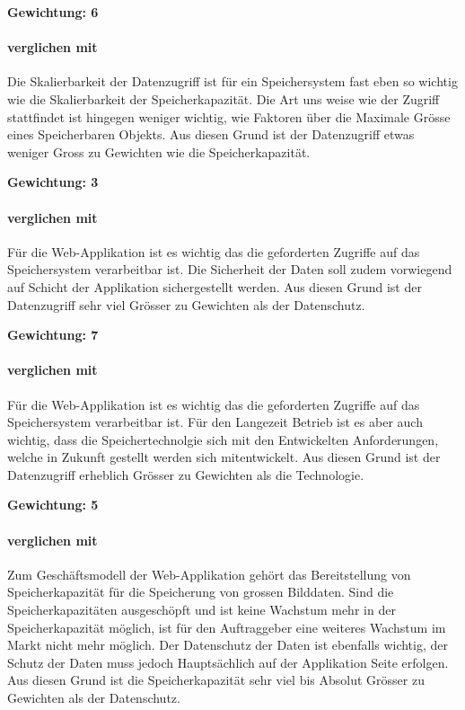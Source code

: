 \textbf{Gewichtung: 6}

\paragraph*{ verglichen mit }
Die Skalierbarkeit der Datenzugriff ist für ein Speichersystem fast eben so wichtig wie die Skalierbarkeit der Speicherkapazität. Die Art uns weise wie der Zugriff stattfindet ist hingegen weniger wichtig, wie Faktoren über die Maximale Grösse eines Speicherbaren Objekts. Aus diesen Grund ist der Datenzugriff etwas weniger Gross zu Gewichten wie die Speicherkapazität. 

\textbf{Gewichtung: 3}

\paragraph*{ verglichen mit }
Für die Web-Applikation ist es wichtig das die geforderten Zugriffe auf das Speichersystem verarbeitbar ist. Die Sicherheit der Daten soll zudem vorwiegend auf Schicht der Applikation sichergestellt werden. Aus diesen Grund ist der Datenzugriff sehr viel Grösser zu Gewichten als der Datenschutz.

\textbf{Gewichtung: 7}

\paragraph*{ verglichen mit }
Für die Web-Applikation ist es wichtig das die geforderten Zugriffe auf das Speichersystem verarbeitbar ist. Für den Langezeit Betrieb ist es aber auch wichtig, dass die Speichertechnolgie sich mit den Entwickelten Anforderungen, welche in Zukunft gestellt werden sich mitentwickelt. Aus diesen Grund ist der Datenzugriff erheblich Grösser zu Gewichten als die Technologie.

\textbf{Gewichtung: 5}

\paragraph*{ verglichen mit }
Zum Geschäftsmodell der Web-Applikation gehört das Bereitstellung von Speicherkapazität für die Speicherung von grossen Bilddaten. Sind die Speicherkapazitäten ausgeschöpft und ist keine Wachstum mehr in der Speicherkapazität möglich, ist für den Auftraggeber eine weiteres Wachstum im Markt nicht mehr möglich. Der Datenschutz der Daten ist ebenfalls wichtig, der Schutz der Daten muss jedoch Hauptsächlich auf der Applikation Seite erfolgen. Aus diesen Grund ist die Speicherkapazität sehr viel bis Absolut Grösser zu Gewichten als der Datenschutz.

